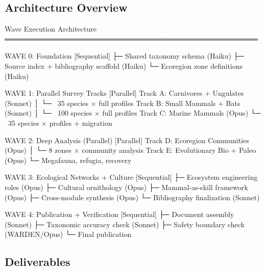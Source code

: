 \documentclass[11pt,letterpaper]{article}
\begin{document}
\subsection{Architecture Overview}

\begin{asciibox}
Wave Execution Architecture
══════════════════════════════════════════════════

WAVE 0: Foundation                       [Sequential]
  ├─ Shared taxonomy schema (Haiku)
  ├─ Source index + bibliography scaffold (Haiku)
  └─ Ecoregion zone definitions (Haiku)

WAVE 1: Parallel Survey Tracks           [Parallel]
  Track A: Carnivores + Ungulates (Sonnet)
  │  └─ ~35 species × full profiles
  Track B: Small Mammals + Bats (Sonnet)
  │  └─ ~100 species × full profiles
  Track C: Marine Mammals (Opus)
     └─ ~35 species × profiles + migration

WAVE 2: Deep Analysis (Parallel)         [Parallel]
  Track D: Ecoregion Communities (Opus)
  │  └─ 8 zones × community analysis
  Track E: Evolutionary Bio + Paleo (Opus)
     └─ Megafauna, refugia, recovery

WAVE 3: Ecological Networks + Culture    [Sequential]
  ├─ Ecosystem engineering roles (Opus)
  ├─ Cultural ornithology (Opus)
  ├─ Mammal-as-skill framework (Opus)
  ├─ Cross-module synthesis (Opus)
  └─ Bibliography finalization (Sonnet)

WAVE 4: Publication + Verification       [Sequential]
  ├─ Document assembly (Sonnet)
  ├─ Taxonomic accuracy check (Sonnet)
  ├─ Safety boundary check (WARDEN/Opus)
  └─ Final publication
\end{asciibox}

\subsection{Deliverables}
\end{document}
